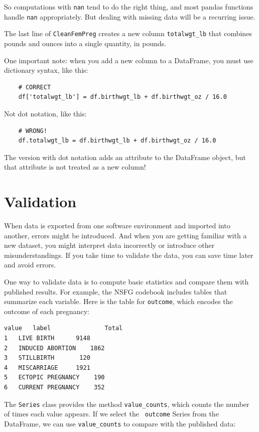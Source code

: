 \documentclass[12pt]{book}
\begin{document}
So computations with {\tt nan} tend to do the right thing, and most
pandas functions handle {\tt nan} appropriately.  But dealing with
missing data will be a recurring issue.

The last line of {\tt CleanFemPreg} creates a new
column \verb"totalwgt_lb" that combines pounds and ounces into
a single quantity, in pounds.

One important note: when you add a new column to a DataFrame, you
must use dictionary syntax, like this:

\begin{verbatim}
    # CORRECT
    df['totalwgt_lb'] = df.birthwgt_lb + df.birthwgt_oz / 16.0 
\end{verbatim}

Not dot notation, like this:

\begin{verbatim}
    # WRONG!
    df.totalwgt_lb = df.birthwgt_lb + df.birthwgt_oz / 16.0 
\end{verbatim}

The version with dot notation adds an attribute to the DataFrame
object, but that attribute is not treated as a new column!


\section{Validation}

When data is exported from one software environment and imported into
another, errors might be introduced.  And when you are
getting familiar with a new dataset, you might interpret data
incorrectly or introduce other misunderstandings.  If you take
time to validate the data, you can save time later and avoid errors.

One way to validate data is to compute basic statistics and compare
them with published results.  For example, the NSFG codebook includes
tables that summarize each variable.  Here is the table for
{\tt outcome}, which encodes the outcome of each pregnancy:

\begin{verbatim}
value	label	 	        Total
1	LIVE BIRTH	 	9148
2	INDUCED ABORTION	1862
3	STILLBIRTH	 	 120
4	MISCARRIAGE	 	1921
5	ECTOPIC PREGNANCY	 190
6	CURRENT PREGNANCY	 352
\end{verbatim}

The {\tt Series} class provides the method \verb"value_counts", which
counts the number of times each value appears.  If we select the {\tt
  outcome} Series from the DataFrame, we can use \verb"value_counts"
to compare with the published data:
\end{document}
